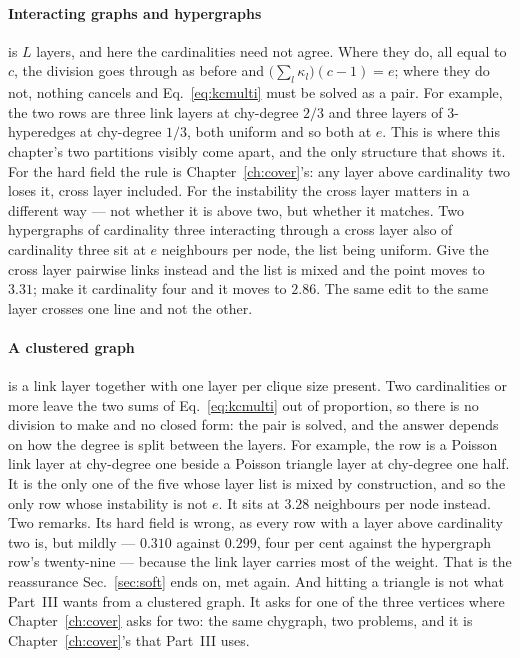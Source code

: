 \paragraph{Interacting graphs and hypergraphs} is $L$ layers, and here the
cardinalities need not agree. Where they do, all equal to $c$, the division goes
through as before and $\bigl(\sum_{l}\kappa_{l}\bigr)(c-1)=e$; where they do
not, nothing cancels and Eq.~\eqref{eq:kcmulti} must be solved as a pair. For
example, the two rows are three link layers at chy-degree $2/3$ and three layers
of $3$-hyperedges at chy-degree $1/3$, both uniform and so both at $e$. This is
where this chapter's two partitions visibly come apart, and the only structure
that shows it. For
the hard field the rule is Chapter~\ref{ch:cover}'s: any layer above cardinality
two loses it, cross layer included. For the instability the cross layer matters
in a different way --- not whether it is above two, but whether it matches. Two
hypergraphs of cardinality three interacting through a cross layer also of
cardinality three sit at $e$ neighbours per node, the list being uniform. Give
the cross layer pairwise links instead and the list is mixed and the point moves
to $3.31$; make it cardinality four and it moves to $2.86$. The same edit to the
same layer crosses one line and not the other.

\paragraph{A clustered graph} is a link layer together with one layer per clique
size present. Two cardinalities or more leave the two sums of
Eq.~\eqref{eq:kcmulti} out of proportion, so there is no division to make and no
closed form: the pair is solved, and the answer depends on how the degree is
split between the layers.
For example, the row is a Poisson link layer at chy-degree one beside a Poisson
triangle layer at chy-degree one half. It is the only one of the five whose
layer list is mixed by construction, and so the only row whose instability is
not $e$. It sits at $3.28$ neighbours per node
instead. Two remarks. Its hard field is wrong, as every row with a layer above
cardinality two is, but mildly --- $0.310$ against $0.299$, four per cent
against the hypergraph row's twenty-nine --- because the link layer carries most
of the weight. That is the reassurance Sec.~\ref{sec:soft} ends on, met again. And
hitting a triangle is not what Part~III wants from a clustered graph. It asks
for one of the three vertices where Chapter~\ref{ch:cover} asks for two: the
same chygraph, two problems, and it is Chapter~\ref{ch:cover}'s that Part~III
uses.

